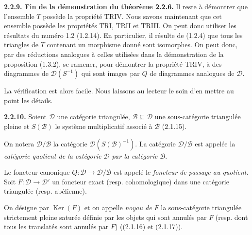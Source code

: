\smallskip
\noindent\textbf{2.2.9. Fin de la démonstration du théorème 2.2.6.}
%
Il reste à démontrer que l'ensemble $T$ possède la propriété TRIV. Nous
savons maintenant que cet ensemble possède les propriétés TRI, TRII et
TRIII. On peut donc utiliser les résultats du numéro 1.2 (1.2.14). En
particulier, il résulte de (1.2.4) que tous les triangles de $T$ contenant
un morphisme donné sont isomorphes. On peut donc, par des réductions
analogues à celles utilisées dans la démonstration de la proposition
(1.3.2), se ramener, pour démontrer la propriété TRIV, à des diagrammes de
$\mathcal D(S^{-1})$ qui sont images par $Q$ de diagrammes analogues de
$\mathcal D$.

La vérification est alors facile. Nous laissons au lecteur le soin d'en
mettre au point les détails.

\smallskip
\noindent\textbf{2.2.10.}\quad
Soient $\mathcal D$ une catégorie triangulée,
$\mathcal B\subseteq\mathcal D$ une sous-catégorie triangulée pleine et
$S(\mathcal B)$ le système multiplicatif associé à $\mathcal B$
(2.1.15).

On notera $\mathcal D/\mathcal B$ la catégorie
$\mathcal D(S(\mathcal B)^{-1})$. La catégorie $\mathcal D/\mathcal B$
est appelée la \emph{catégorie quotient de la catégorie $\mathcal D$ par
la catégorie $\mathcal B$}.

Le foncteur canonique
$Q\colon\mathcal D\longrightarrow\mathcal D/\mathcal B$ est appelé le
\emph{foncteur de passage au quotient}. Soit
$F\colon\mathcal D\longrightarrow\mathcal D'$ un foncteur exact
(resp. cohomologique) dans une catégorie triangulée (resp. abélienne).

On désigne par $\operatorname{Ker}(F)$ et on appelle \emph{noyau de $F$}
la sous-catégorie triangulée strictement pleine saturée définie par les
objets qui sont annulés par $F$ (resp. dont tous les translatés sont
annulés par $F$) ((2.1.16) et (2.1.17)).

\endgroup

